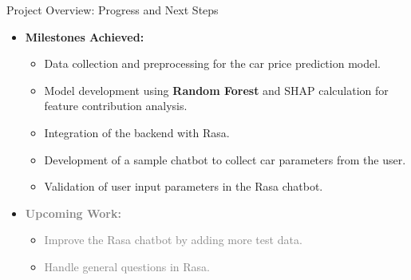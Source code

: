 \documentclass{beamer}
\begin{document}
\begin{frame}{Project Overview: Progress and Next Steps}
    \begin{itemize}
        \item \textbf{Milestones Achieved:}
        \begin{itemize}
            \item Data collection and preprocessing for the car price prediction model.
            \item Model development using \textbf{Random Forest} and SHAP calculation for feature contribution analysis.
            \item Integration of the backend with Rasa.
            \item Development of a sample chatbot to collect car parameters from the user.
            \item Validation of user input parameters in the Rasa chatbot.
        \end{itemize}
        
        \item \textbf{\textcolor{gray}{Upcoming Work:}}
        \begin{itemize}
            \item \textcolor{gray}{Improve the Rasa chatbot by adding more test data.}
            \item \textcolor{gray}{Handle general questions in Rasa.}
        \end{itemize}
    \end{itemize}
\end{frame}
\end{document}
